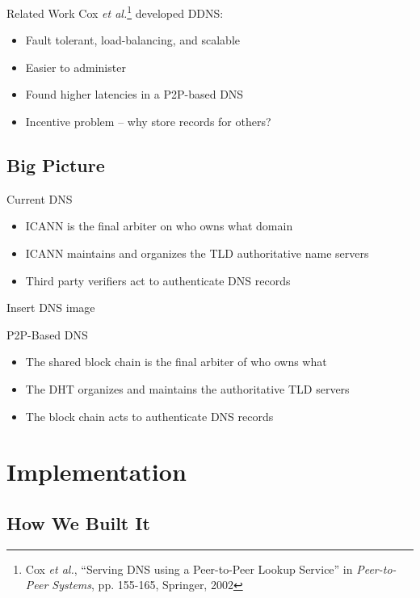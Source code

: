 \documentclass[11pt]{beamer}
\begin{document}
\begin{frame}{Related Work}
	Cox \textit{et al.}\footnote{Cox \textit{et al.}, ``Serving DNS using a Peer-to-Peer Lookup Service'' in \textit{Peer-to-Peer Systems}, pp. 155-165, Springer, 2002 } developed DDNS:
	\begin{itemize}
		\item Fault tolerant, load-balancing, and scalable
		\item Easier to administer
		\item Found higher latencies in a P2P-based DNS
		\item Incentive problem --  why store records for others?
	\end{itemize}
\end{frame}

\subsection{Big Picture}

\begin{frame}{Current DNS}
	\begin{itemize}
		\item ICANN is the final arbiter on who owns what domain
		\item ICANN maintains and organizes the TLD authoritative name servers
		\item Third party verifiers act to authenticate DNS records
	\end{itemize}


Insert DNS image
\end{frame}


\begin{frame}{P2P-Based DNS}
	
	\begin{itemize}
		\item The shared block chain is the final arbiter of who owns what
		\item The DHT organizes and maintains the authoritative TLD servers
		\item The block chain acts to authenticate DNS records
	\end{itemize}
\end{frame}



\section{Implementation}

\subsection{How We Built It}
\end{document}
